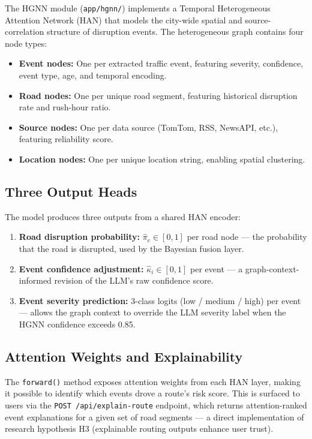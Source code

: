 \documentclass[12pt, a4paper]{report}
\begin{document}
The HGNN module (\texttt{app/hgnn/}) implements a Temporal Heterogeneous Attention Network (HAN) that models the city-wide spatial and source-correlation structure of disruption events. The heterogeneous graph contains four node types:

\begin{itemize}
    \item \textbf{Event nodes:} One per extracted traffic event, featuring severity, confidence, event type, age, and temporal encoding.
    \item \textbf{Road nodes:} One per unique road segment, featuring historical disruption rate and rush-hour ratio.
    \item \textbf{Source nodes:} One per data source (TomTom, RSS, NewsAPI, etc.), featuring reliability score.
    \item \textbf{Location nodes:} One per unique location string, enabling spatial clustering.
\end{itemize}

\subsection{Three Output Heads}

The model produces three outputs from a shared HAN encoder:

\begin{enumerate}
    \item \textbf{Road disruption probability:} $\hat{\pi}_e \in [0, 1]$ per road node — the probability that the road is disrupted, used by the Bayesian fusion layer.
    \item \textbf{Event confidence adjustment:} $\hat{\kappa}_i \in [0, 1]$ per event — a graph-context-informed revision of the LLM's raw confidence score.
    \item \textbf{Event severity prediction:} 3-class logits (low / medium / high) per event — allows the graph context to override the LLM severity label when the HGNN confidence exceeds 0.85.
\end{enumerate}

\subsection{Attention Weights and Explainability}

The \texttt{forward()} method exposes attention weights from each HAN layer, making it possible to identify which events drove a route's risk score. This is surfaced to users via the \texttt{POST /api/explain-route} endpoint, which returns attention-ranked event explanations for a given set of road segments — a direct implementation of research hypothesis H3 (explainable routing outputs enhance user trust).
\end{document}
